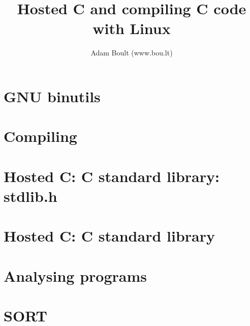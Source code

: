 \documentclass[oneside]{book}
\begin{document}
\author{Adam Boult (www.bou.lt)}
\title{Hosted C and compiling C code with Linux}
\maketitle

\setcounter{tocdepth}{0}
\tableofcontents



\part{GNU binutils}


\part{Compiling}




\part{Hosted C: C standard library: stdlib.h}






\part{Hosted C: C standard library}













\part{Analysing programs}




\part{SORT}

\end{document}
